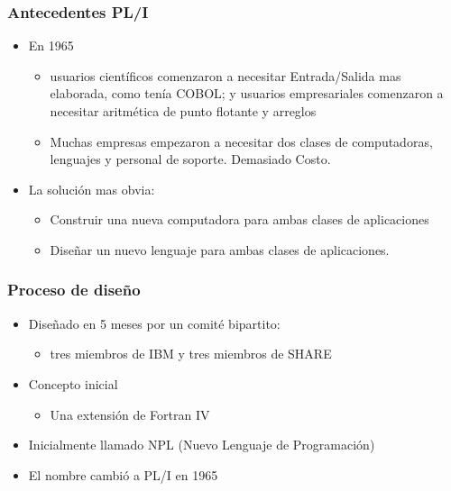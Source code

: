 \documentclass[11pt]{article}
\begin{document}
\subsubsection*{Antecedentes PL/I}
\label{sec:orgheadline72}
\begin{itemize}
\item En 1965
\begin{itemize}
\item usuarios científicos comenzaron a necesitar Entrada/Salida mas
elaborada, como tenía COBOL; y usuarios empresariales comenzaron a
necesitar aritmética de punto flotante y arreglos
\item Muchas empresas empezaron a necesitar dos clases de computadoras,
lenguajes y personal de soporte. Demasiado Costo.
\end{itemize}
\item La solución mas obvia:
\begin{itemize}
\item Construir una nueva computadora para ambas clases de aplicaciones
\item Diseñar un nuevo lenguaje para ambas clases de aplicaciones.
\end{itemize}
\end{itemize}

\subsubsection*{Proceso de diseño}
\label{sec:orgheadline73}
\begin{itemize}
\item Diseñado en 5 meses por un comité bipartito:
\begin{itemize}
\item tres miembros de IBM y tres miembros de SHARE
\end{itemize}
\item Concepto inicial
\begin{itemize}
\item Una extensión de Fortran IV
\end{itemize}
\item Inicialmente llamado NPL (Nuevo Lenguaje de Programación)
\item El nombre cambió a PL/I en 1965
\end{itemize}
\end{document}
